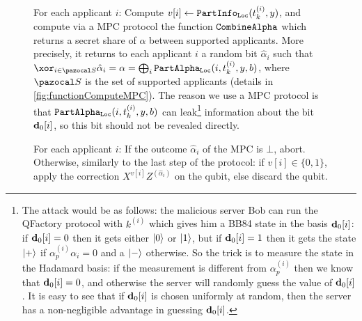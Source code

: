 \begin{figure}[htbp]
\begin{minipage}{1.0\linewidth}
\begin{protocol}[H]
\begin{compressedList}
        \item For each applicant $i$: Compute $v[i] \gets {\tt PartInfo_{\tt Loc}}(t_k^{(i)},y)$, and compute via a MPC protocol the function ${\tt CombineAlpha}$ which returns a secret share of $\alpha$ between supported applicants. More precisely, it returns to each applicant $i$ a random bit $\hat{\alpha}_i$ such that $\xor_{i \in \cS} \hat{\alpha}_i = \alpha = \bigoplus_i \partialAlpha(i, t_k^{(i)},y,b)$, where $\cS$ is the set of supported applicants (details in \cref{fig:functionComputeMPC}). The reason we use a MPC protocol is that ${\tt PartAlpha_{\tt Loc}}(i, t_k^{(i)},y,b)$ can leak\footnote{The attack would be as follows: the malicious server Bob can run the QFactory \cite{CCKW_2019_qfactory} protocol with $k^{(i)}$ which gives him a BB84 state in the basis $\mathbf{d}_0[i]$: if $\mathbf{d}_0[i] = 0$ then it gets either $\ket{0}$ or $\ket{1}$, but if $\mathbf{d}_0[i] = 1$ then it gets the state $\ket{+}$ if $\alpha_p^{(i)}{\alpha}_i = 0$ and a $\ket{-}$ otherwise. So the trick is to measure the state in the Hadamard basis: if the measurement is different from $\alpha_p^{(i)}$ then we know that $\mathbf{d}_0[i] = 0$, and otherwise the server will randomly guess the value of $\mathbf{d}_0[i]$. It is easy to see that if $\mathbf{d}_0[i]$ is chosen uniformly at random, then the server has a non-negligible advantage in guessing $\mathbf{d}_0[i]$.} information about the bit $\mathbf{d}_0[i]$, so this bit should not be revealed directly.
        \item For each applicant $i$: If the outcome $\hat{\alpha}_i$ of the MPC is $\bot$, abort. Otherwise, similarly to the last step of the \blindCanSup protocol: if $v[i] \in \{0,1\}$, apply the correction $X^{v[i]}Z^{(\hat{\alpha}_i)}$ on the qubit, else discard the qubit.
      \end{compressedList}
    \end{protocol}
  \end{minipage}
\end{figure}


